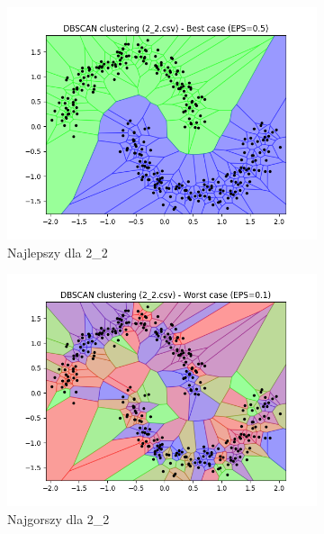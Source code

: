 \documentclass[12pt]{article}
\begin{document}
\begin{figure}[H]
\begin{subfigure}[b]{0.24\textwidth}
        \includegraphics[width=\linewidth]{img/exp_1/dbscan/2_2_best.png}
        \caption{Najlepszy dla 2\_2}
    \end{subfigure}
    \hfill
    \begin{subfigure}[b]{0.24\textwidth}
        \includegraphics[width=\linewidth]{img/exp_1/dbscan/2_2_worst.png}
        \caption{Najgorszy dla 2\_2}
    \end{subfigure}
    \hfill
    \begin{subfigure}[b]{0.24\textwidth}

\end{subfigure}
\end{figure}
\end{document}
